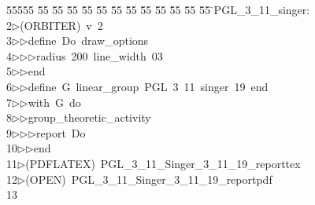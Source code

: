 %
%
\begin{tabbing}
55555 \= 55 \= 55 \= 55 \= 55 \= 55 \= 55 \= 55 \= 55 \= 55 \= 55 \= 55 \= 55 \= \>PGL\_3\_11\_singer:\\[0pt]
2\>$\triangleright$\>(ORBITER)\ v\ 2\ \\[0pt]
3\>$\triangleright$\>$\triangleright$\>define\ Do\ draw\_options\ \\[0pt]
4\>$\triangleright$\>$\triangleright$\>$\triangleright$\>radius\ 200\ line\_width\ 03\ \\[0pt]
5\>$\triangleright$\>$\triangleright$\>end\ \\[0pt]
6\>$\triangleright$\>$\triangleright$\>define\ G\ linear\_group\ PGL\ 3\ 11\ singer\ 19\ end\ \\[0pt]
7\>$\triangleright$\>$\triangleright$\>with\ G\ do\ \\[0pt]
8\>$\triangleright$\>$\triangleright$\>group\_theoretic\_activity\ \\[0pt]
9\>$\triangleright$\>$\triangleright$\>$\triangleright$\>report\ Do\ \\[0pt]
10\>$\triangleright$\>$\triangleright$\>end\\[0pt]
11\>$\triangleright$\>(PDFLATEX)\ PGL\_3\_11\_Singer\_3\_11\_19\_reporttex\\[0pt]
12\>$\triangleright$\>(OPEN)\ PGL\_3\_11\_Singer\_3\_11\_19\_reportpdf\\[0pt]
13\>\end{tabbing}
